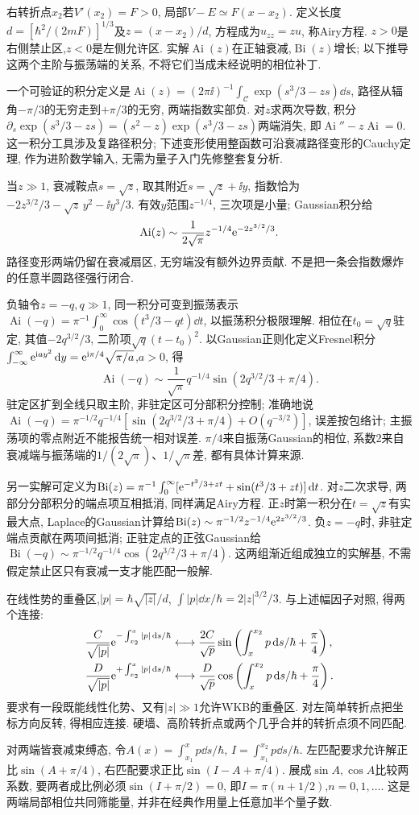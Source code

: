 右转折点$x_2$若$V'(x_2)=F>0$, 局部$V-E\simeq F(x-x_2)$. 定义长度$d=[\hbar^2/(2mF)]^{1/3}$及$z=(x-x_2)/d$, 方程成为$u_{zz}=zu$, 称Airy方程. $z>0$是右侧禁止区,$z<0$是左侧允许区. 实解$\operatorname{Ai}(z)$在正轴衰减,$\operatorname{Bi}(z)$增长; 以下推导这两个主阶与振荡端的关系, 不将它们当成未经说明的相位补丁.

一个可验证的积分定义是$\operatorname{Ai}(z)=(2\pi\ii)^{-1}\int_{\mathcal C}\exp(s^3/3-zs)\dd s$, 路径从辐角$-\pi/3$的无穷走到$+\pi/3$的无穷, 两端指数实部负. 对$z$求两次导数, 积分$\partial_s\exp(s^3/3-zs)=(s^2-z)\exp(s^3/3-zs)$两端消失, 即$\operatorname{Ai}''-z\operatorname{Ai}=0$. 这一积分工具涉及复路径积分; 下述变形使用整函数可沿衰减路径变形的Cauchy定理, 作为进阶数学输入, 无需为量子入门先修整套复分析.

当$z\gg1$, 衰减鞍点$s=\sqrt z$, 取其附近$s=\sqrt z+\ii y$, 指数恰为$-2z^{3/2}/3-\sqrt z\,y^2-\ii y^3/3$. 有效$y$范围$z^{-1/4}$, 三次项是小量; Gaussian积分给
\[
\operatorname{Ai}(z)\sim\frac1{2\sqrt\pi}z^{-1/4}\mathrm e^{-2z^{3/2}/3}.
\]
路径变形两端仍留在衰减扇区, 无穷端没有额外边界贡献. 不是把一条会指数爆炸的任意半圆路径强行闭合.

负轴令$z=-q,q\gg1$, 同一积分可变到振荡表示$\operatorname{Ai}(-q)=\pi^{-1}\int_0^\infty\cos(t^3/3-qt)\dd t$, 以振荡积分极限理解. 相位在$t_0=\sqrt q$驻定, 其值$-2q^{3/2}/3$, 二阶项$\sqrt q(t-t_0)^2$. 以Gaussian正则化定义Fresnel积分$\int_{-\infty}^\infty\mathrm e^{\mathrm i a y^2}\,\mathrm d y=\mathrm e^{\mathrm i\pi/4}\sqrt{\pi/a}$,$a>0$, 得
\[
\operatorname{Ai}(-q)\sim\frac1{\sqrt\pi}q^{-1/4}\sin(2q^{3/2}/3+\pi/4).
\]
驻定区扩到全线只取主阶, 非驻定区可分部积分控制; 准确地说$\operatorname{Ai}(-q)=\pi^{-1/2}q^{-1/4}[\sin(2q^{3/2}/3+\pi/4)+O(q^{-3/2})]$, 误差按包络计; 主振荡项的零点附近不能报告统一相对误差. $\pi/4$来自振荡Gaussian的相位, 系数2来自衰减端与振荡端的$1/(2\sqrt\pi)$、$1/\sqrt\pi$差, 都有具体计算来源.

另一实解可定义为$\operatorname{Bi}(z)=\pi^{-1}\int_0^\infty[\mathrm e^{-t^3/3+zt}+\sin(t^3/3+zt)]\,\mathrm d t$. 对$z$二次求导, 两部分分部积分的端点项互相抵消, 同样满足Airy方程. 正$z$时第一积分在$t=\sqrt z$有实最大点, Laplace的Gaussian计算给$\operatorname{Bi}(z)\sim\pi^{-1/2}z^{-1/4}\mathrm e^{2z^{3/2}/3}$. 负$z=-q$时, 非驻定端点贡献在两项间抵消; 正驻定点的正弦Gaussian给$\operatorname{Bi}(-q)\sim\pi^{-1/2}q^{-1/4}\cos(2q^{3/2}/3+\pi/4)$. 这两组渐近组成独立的实解基, 不需假定禁止区只有衰减一支才能匹配一般解.

在线性势的重叠区,$|p|=\hbar\sqrt{|z|}/d$, $\int|p|\dd x/\hbar=2|z|^{3/2}/3$. 与上述幅因子对照, 得两个连接:
\[
\begin{aligned}
\frac C{\sqrt{|p|}}\mathrm e^{-\int_{x_2}^x|p|\,\mathrm d s/\hbar}
&\longleftrightarrow\frac{2C}{\sqrt p}\sin\left(\int_x^{x_2}p\,\mathrm d s/\hbar+\frac\pi4\right),\\
\frac D{\sqrt{|p|}}\mathrm e^{+\int_{x_2}^x|p|\,\mathrm d s/\hbar}
&\longleftrightarrow\frac D{\sqrt p}\cos\left(\int_x^{x_2}p\,\mathrm d s/\hbar+\frac\pi4\right).
\end{aligned}
\]
要求有一段既能线性化势、又有$|z|\gg1$允许WKB的重叠区. 对左简单转折点把坐标方向反转, 得相应连接. 硬墙、高阶转折点或两个几乎合并的转折点须不同匹配.

对两端皆衰减束缚态, 令$A(x)=\int_{x_1}^xp\dd s/\hbar$, $I=\int_{x_1}^{x_2}p\dd s/\hbar$. 左匹配要求允许解正比$\sin(A+\pi/4)$, 右匹配要求正比$\sin(I-A+\pi/4)$. 展成$\sin A,\cos A$比较两系数, 要两者成比例必须$\sin(I+\pi/2)=0$, 即$I=\pi(n+1/2)$,$n=0,1,\ldots$. 这是两端局部相位共同筛能量, 并非在经典作用量上任意加半个量子数.
